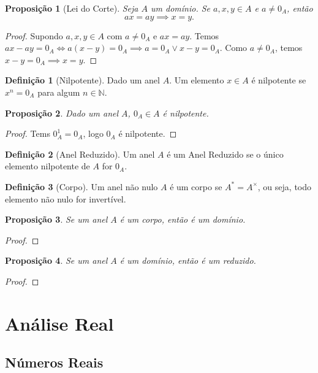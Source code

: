 \documentclass{article}
\theoremstyle{plain}
\newtheorem{prop}{Proposição}[section]
\theoremstyle{definition}
\newtheorem{definicao}{Definição}[section]
\theoremstyle{remark}
\begin{document}
\begin{prop}[Lei do Corte]
	Seja $A$ um domínio. Se $a,x,y \in A$ e $a\neq 0_A$, então $$ ax = ay \implies x = y.$$
\end{prop}
\begin{proof}
	Supondo $a,x,y\in A$ com $a\neq 0_A$ e $ax=ay$. Temos $ax -ay = 0_A  \iff a(x-y) = 0_A \implies a = 0_A \lor x-y = 0_A$.  Como $a\neq 0_A$, temos $x-y = 0_A \implies x = y$.
\end{proof}
\begin{definicao}[Nilpotente]
	Dado um anel $A$. Um elemento $x\in A$ é nilpotente se $x^n = 0_A$ para algum $n\in \mathbb{N}$.
\end{definicao}
\begin{prop}
	Dado um anel $A$, $0_A \in A$ é nilpotente.
\end{prop}
\begin{proof}
	Tems $0_A^1 = 0_A $, logo $0_A$ é nilpotente.
\end{proof}
\begin{definicao}[Anel Reduzido]
	Um anel $A$ é um Anel Reduzido  se o único elemento nilpotente de $A$ for $0_A$.
\end{definicao}
\begin{definicao}[Corpo]
	Um anel não nulo $A$ é um corpo se $A^{*} = A^{\times}$, ou seja, todo elemento não nulo for invertível.
\end{definicao}

\begin{prop}
	Se um anel $A$ é um corpo, então é um domínio.
\end{prop}
\begin{proof}
\end{proof}
\begin{prop}
	Se um anel $A$ é um domínio, então é um reduzido.
\end{prop}
\begin{proof}
\end{proof}
\section{Análise Real}
\subsection{Números Reais}
\end{document}
